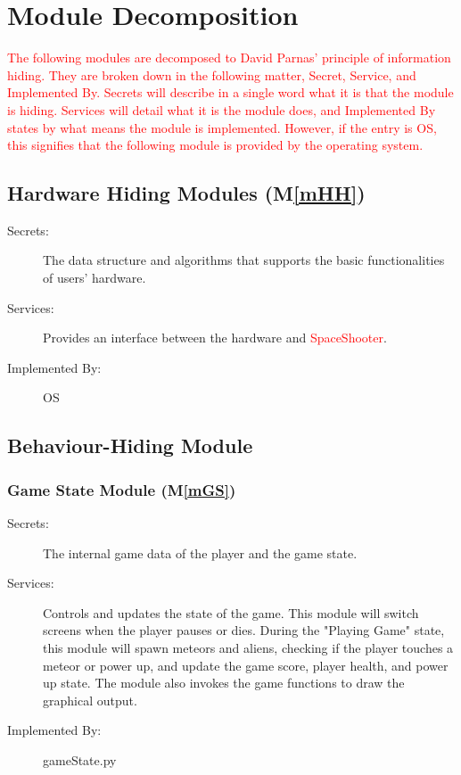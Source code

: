 \documentclass[12pt, titlepage]{article}
\newcommand{\mref}[1]{M\ref{#1}}
\begin{document}
\section{Module Decomposition} \label{SecMD}
\textcolor{red}{The  following  modules  are  decomposed  to  David  Parnas’  principle  of  information  hiding. They are broken down in the following matter, Secret, Service, and Implemented By. Secrets will describe in a single word what it is that the module is hiding. Services will detail what it is the module does, and Implemented By states by what means the module is implemented. However,  if  the  entry  is OS,  this  signifies  that  the  following  module  is  provided  by  the operating system.}
\subsection{Hardware Hiding Modules (\mref{mHH})}

\begin{description}
\item[Secrets:] The data structure and algorithms that supports the basic functionalities of users' hardware.
\item[Services:] Provides an interface between the hardware and \textcolor{red}{SpaceShooter}.
\item[Implemented By:] OS
\end{description}

\subsection{Behaviour-Hiding Module}

\subsubsection{Game State Module (\mref{mGS})}

\begin{description}
\item[Secrets:]The internal game data of the player and the game state. 
\item[Services:] Controls and updates the state of the game. This module will switch screens when the player pauses or dies. During the "Playing Game" state, this module will spawn meteors and aliens, checking if the player touches a meteor or power up, and update the game score, player health, and power up state. The module also invokes the game functions to draw the graphical output.  
\item[Implemented By:] gameState.py
\end{description}
\end{document}
